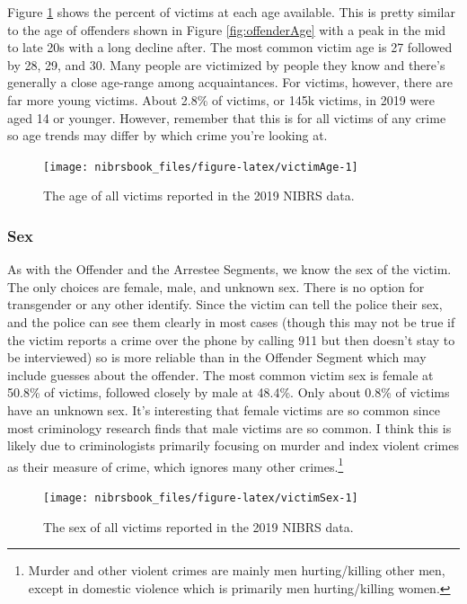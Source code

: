 \documentclass[
  12pt,
  openany]{book}
\begin{document}
Figure \ref{fig:victimAge} shows the percent of victims at each age available. This is pretty similar to the age of offenders shown in Figure \ref{fig:offenderAge} with a peak in the mid to late 20s with a long decline after. The most common victim age is 27 followed by 28, 29, and 30. Many people are victimized by people they know and there's generally a close age-range among acquaintances. For victims, however, there are far more young victims. About 2.8\% of victims, or 145k victims, in 2019 were aged 14 or younger. However, remember that this is for all victims of any crime so age trends may differ by which crime you're looking at.

\begin{figure}

{\centering \texttt{[image: nibrsbook\_files/figure-latex/victimAge-1]} 

}

\caption{The age of all victims reported in the 2019 NIBRS data.}\label{fig:victimAge}
\end{figure}

\hypertarget{sex-1}{%
\subsubsection{Sex}\label{sex-1}}

As with the Offender and the Arrestee Segments, we know the sex of the victim. The only choices are female, male, and unknown sex. There is no option for transgender or any other identify. Since the victim can tell the police their sex, and the police can see them clearly in most cases (though this may not be true if the victim reports a crime over the phone by calling 911 but then doesn't stay to be interviewed) so is more reliable than in the Offender Segment which may include guesses about the offender. The most common victim sex is female at 50.8\% of victims, followed closely by male at 48.4\%. Only about 0.8\% of victims have an unknown sex. It's interesting that female victims are so common since most criminology research finds that male victims are so common. I think this is likely due to criminologists primarily focusing on murder and index violent crimes as their measure of crime, which ignores many other crimes.\footnote{Murder and other violent crimes are mainly men hurting/killing other men, except in domestic violence which is primarily men hurting/killing women.}

\begin{figure}

{\centering \texttt{[image: nibrsbook\_files/figure-latex/victimSex-1]} 

}

\caption{The sex of all victims reported in the 2019 NIBRS data.}\label{fig:victimSex}
\end{figure}
\end{document}
